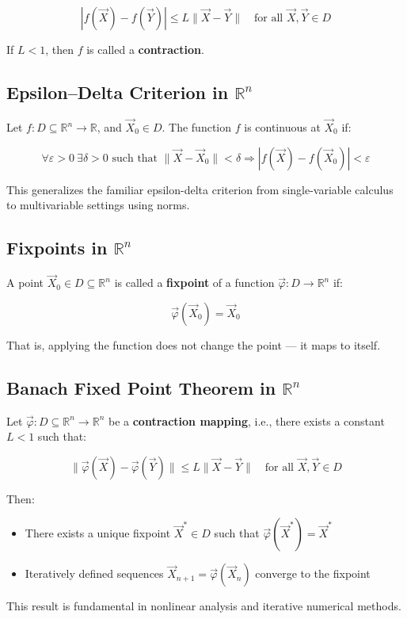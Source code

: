 \[
|f(\vec{X}) - f(\vec{Y})| \le L \|\vec{X} - \vec{Y}\| \quad \text{for all } \vec{X}, \vec{Y} \in D
\]

If \( L < 1 \), then \( f \) is called a \textbf{contraction}.



\subsection{Epsilon–Delta Criterion in \( \mathbb{R}^n \)}

Let \( f : D \subseteq \mathbb{R}^n \to \mathbb{R} \), and \( \vec{X}_0 \in D \). The function \( f \) is continuous at \( \vec{X}_0 \) if:

\[
\forall \varepsilon > 0 \ \exists \delta > 0 \text{ such that } \|\vec{X} - \vec{X}_0\| < \delta \Rightarrow |f(\vec{X}) - f(\vec{X}_0)| < \varepsilon
\]

This generalizes the familiar epsilon-delta criterion from single-variable calculus to multivariable settings using norms.



\subsection{Fixpoints in \( \mathbb{R}^n \)}
  
A point \( \vec{X}_0 \in D \subseteq \mathbb{R}^n \) is called a \textbf{fixpoint} of a function \( \vec{\varphi} : D \to \mathbb{R}^n \) if:

\[
\vec{\varphi}(\vec{X}_0) = \vec{X}_0
\]

That is, applying the function does not change the point — it maps to itself.



\subsection{Banach Fixed Point Theorem in \( \mathbb{R}^n \)}

Let \( \vec{\varphi} : D \subseteq \mathbb{R}^n \to \mathbb{R}^n \) be a \textbf{contraction mapping}, i.e., there exists a constant \( L < 1 \) such that:

\[
\|\vec{\varphi}(\vec{X}) - \vec{\varphi}(\vec{Y})\| \le L \|\vec{X} - \vec{Y}\| \quad \text{for all } \vec{X}, \vec{Y} \in D
\]

Then:
\begin{itemize}[label=\(-\)]
\item There exists a unique fixpoint \( \vec{X}^* \in D \) such that \( \vec{\varphi}(\vec{X}^*) = \vec{X}^* \)
\item Iteratively defined sequences \( \vec{X}_{n+1} = \vec{\varphi}(\vec{X}_n) \) converge to the fixpoint
\end{itemize}

This result is fundamental in nonlinear analysis and iterative numerical methods.



\newpage